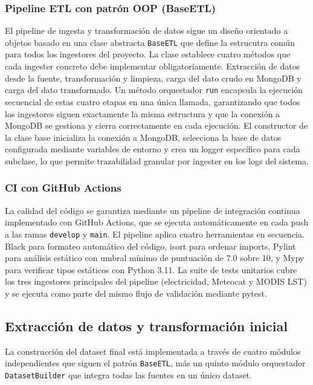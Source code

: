 \documentclass[12pt, a4paper]{article}
\begin{document}
\subsubsection{Pipeline ETL con patrón OOP (BaseETL)}

El pipeline de ingesta y transformación de datos sigue un diseño orientado a objetos basado en una clase abstracta \texttt{BaseETL} que define la estrucutra común para todos los ingestores del proyecto. La clase establece cuatro métodos  que cada ingester concreto debe implementar obligatoriamente. Extracción de datos desde la fuente, transformación y limpieza, carga del dato crudo en MongoDB y carga del dato transformado. Un método orquestador \texttt{run} encapsula la ejecución secuencial de estas cuatro etapas en una única llamada, garantizando que todos los ingestores siguen exactamente la misma estructura y que la conexión a MongoDB se gestiona y cierra correctamente en cada ejecución. El constructor de la clase base inicializa la conexión a MongoDB, selecciona la base de datos configurada mediante variables de entorno y crea un logger específico para cada subclase, lo que permite trazabilidad granular por ingester en los logs del sistema.

\subsubsection{CI con GitHub Actions}

La calidad del código se garantiza mediante un pipeline de integración continua implementado con GitHub Actions, que se ejecuta automáticamente en cada push a las ramas \texttt{develop} y \texttt{main}. El pipeline aplica cuatro herramientas en secuencia. Black para formateo automático del código, isort para ordenar imports, Pylint para análisis estático con umbral mínimo de puntuación de 7.0 sobre 10, y Mypy para verificar tipos estáticos con Python 3.11. La suite de tests unitarios cubre los tres ingestores principales del pipeline (electricidad, Meteocat y MODIS LST) y se ejecuta como parte del mismo flujo de validación mediante pytest.

\subsection{Extracción de datos y transformación inicial}

La construcción del dataset final está implementada a través de cuatro módulos independientes que siguen el patrón \texttt{BaseETL}, más un quinto módulo orquestador \texttt{DatasetBuilder} que integra todas las fuentes en un único dataset.
\end{document}
